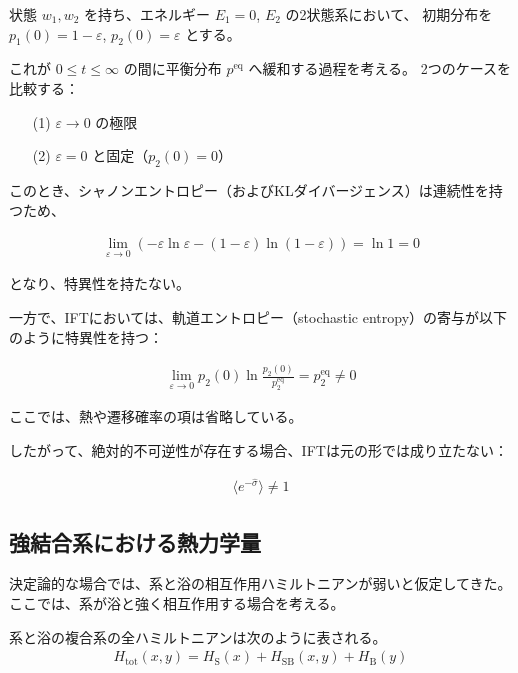\documentclass[a4paper,11pt]{jsarticle}
\numberwithin{equation}{section}
\begin{document}
状態 $w_1, w_2$ を持ち、エネルギー $E_1 = 0$, $E_2$ の2状態系において、
初期分布を $p_1(0) = 1 - \varepsilon$, $p_2(0) = \varepsilon$ とする。

これが $0 \leq t \leq \infty$ の間に平衡分布 $p^{\mathrm{eq}}$ へ緩和する過程を考える。
2つのケースを比較する：

\begin{itemize}
  \item[(1)] $\varepsilon \to 0$ の極限
  \item[(2)] $\varepsilon = 0$ と固定（$p_2(0) = 0$）
\end{itemize}

このとき、シャノンエントロピー（およびKLダイバージェンス）は連続性を持つため、

\begin{align}
\lim_{\varepsilon \to 0} \left( - \varepsilon \ln \varepsilon - (1 - \varepsilon) \ln (1 - \varepsilon) \right)
= \ln 1 = 0
\end{align}

となり、特異性を持たない。

\bigskip

一方で、IFTにおいては、軌道エントロピー（stochastic entropy）の寄与が以下のように特異性を持つ：

\begin{align}
\lim_{\varepsilon \to 0}
p_2(0) \ln \frac{p_2(0)}{p_2^{\mathrm{eq}}}
= p_2^{\mathrm{eq}} \neq 0
\end{align}

ここでは、熱や遷移確率の項は省略している。

したがって、絶対的不可逆性が存在する場合、IFTは元の形では成り立たない：

\begin{align}
\langle e^{-\hat{\sigma}} \rangle \neq 1
\end{align}

\subsection{強結合系における熱力学量}

決定論的な場合では、系と浴の相互作用ハミルトニアンが弱いと仮定してきた。  
ここでは、系が浴と強く相互作用する場合を考える。

系と浴の複合系の全ハミルトニアンは次のように表される。
\begin{align}
H_{\text{tot}}(x, y) = H_{\text{S}}(x) + H_{\text{SB}}(x, y) + H_{\text{B}}(y)
\end{align}
\end{document}
